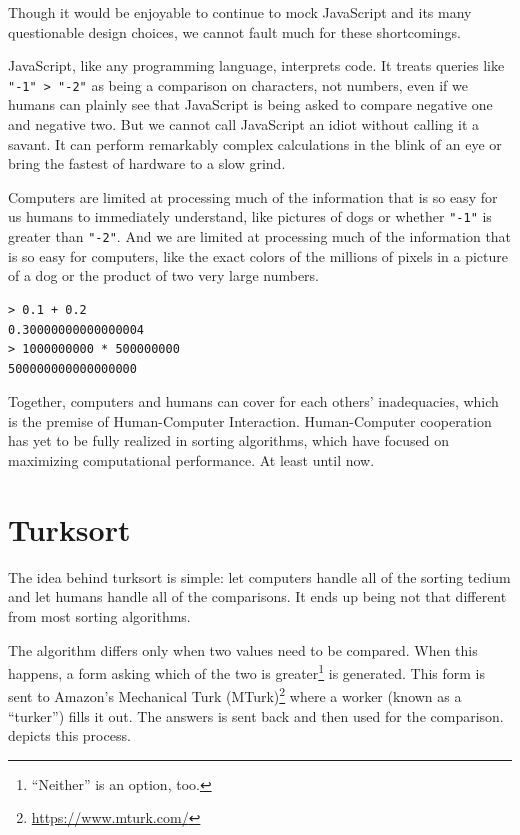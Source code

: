 \documentclass{article}
\begin{document}
Though it would be enjoyable to continue to mock JavaScript and its many
questionable design choices, we cannot fault much for these shortcomings.

JavaScript, like any programming language, interprets code. It treats queries
like \texttt{"-1" > "-2"} as being a comparison on characters, not numbers, even
if we humans can plainly see that JavaScript is being asked to compare negative
one and negative two. But we cannot call JavaScript an idiot without calling it
a savant. It can perform remarkably complex calculations in the blink of an eye
or bring the fastest of hardware to a slow grind.

Computers are limited at processing much of the information that is so easy for
us humans to immediately understand, like pictures of dogs or whether
\texttt{"-1"} is greater than \texttt{"-2"}. And we are limited at processing
much of the information that is so easy for computers, like the exact colors of
the millions of pixels in a picture of a dog or the product of two very large
numbers.

\begin{lstlisting}[caption = Complex Operations in JavaScript (Node.js 12.12.0)]
> 0.1 + 0.2
0.30000000000000004
> 1000000000 * 500000000
500000000000000000
\end{lstlisting}

Together, computers and humans can cover for each others' inadequacies, which is
the premise of Human-Computer Interaction. Human-Computer cooperation has yet to
be fully realized in sorting algorithms, which have focused on maximizing
computational performance. At least until now.

\section{Turksort}

The idea behind turksort is simple: let computers handle all of the sorting
tedium and let humans handle all of the comparisons. It ends up being not that
different from most sorting algorithms.

The algorithm differs only when two values need to be compared. When this
happens, a form asking which of the two is greater\footnote{``Neither'' is an
  option, too.} is generated. This form is sent to Amazon's Mechanical Turk
(MTurk)\footnote{\url{https://www.mturk.com/}} where a worker (known as a
``turker'') fills it out. The answers is sent back and then used for the
comparison.  depicts this process.
\end{document}
